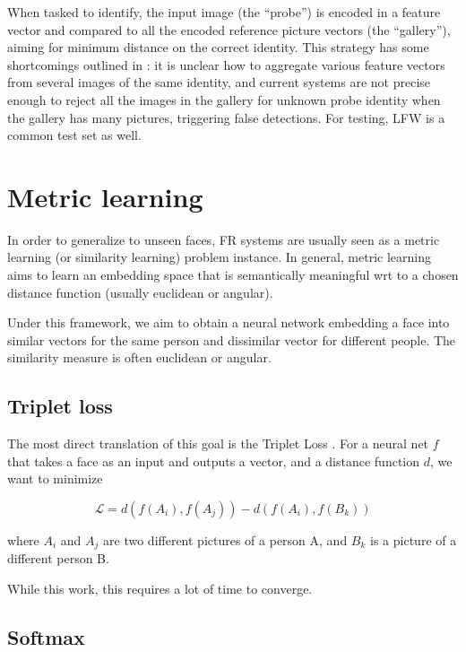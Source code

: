 When tasked to identify, the input image (the “probe”) is encoded in a feature vector and compared to all the encoded reference picture vectors (the “gallery”), aiming for minimum distance on the correct identity. This strategy has some shortcomings outlined in \cite{ijb-a}: it is unclear how to aggregate various feature vectors from several images of the same identity, and current systems are not precise enough to reject all the images in the gallery for unknown probe identity when the gallery has many pictures, triggering false detections. For testing, LFW \cite{lfw} is a common test set as well.

\section{Metric learning}

In order to generalize to unseen faces, FR systems are usually seen as a metric learning (or similarity learning) problem instance. In general, metric learning aims to learn an embedding space that is semantically meaningful wrt to a chosen distance function (usually euclidean or angular).

Under this framework, we aim to obtain a neural network embedding a face into similar vectors for the same person and dissimilar vector for different people. The similarity measure is often euclidean or angular.

\subsection{Triplet loss}

The most direct translation of this goal is the Triplet Loss \citep{triplet-face,tripletloss,triplet}. For a neural net $f$ that takes a face as an input and outputs a vector, and a distance function $d$, we want to minimize

\begin{equation}
    \mathcal{L} = d(f(A_i), f(A_j)) - d(f(A_i), f(B_k))
\end{equation}

where $A_i$ and $A_j$ are two different pictures of a person A, and $B_k$ is a picture of a different person B.

While this work, this requires a lot of time to converge.

\subsection{Softmax}

